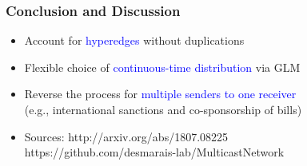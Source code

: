 \documentclass{beamer}
\begin{document}
\begin{frame}
\begin{itemize}
					\end{itemize}
				\end{frame}	
							\begin{frame}
								\frametitle{Conclusion and Discussion}
								\begin{itemize}
									\item Account for \textcolor{blue}{hyperedges} without duplications\vspace{0.15cm}
									\item Flexible choice of \textcolor{blue}{continuous-time distribution} via GLM\vspace{0.15cm}
									\item Reverse the process for  \textcolor{blue}{multiple senders to one receiver}\\ (e.g., international sanctions and co-sponsorship of bills)\vspace{0.15cm}
									\item Sources: http://arxiv.org/abs/1807.08225 \\
						https://github.com/desmarais-lab/MulticastNetwork
									
								\end{itemize}
							\end{frame}	
							
\end{document}
